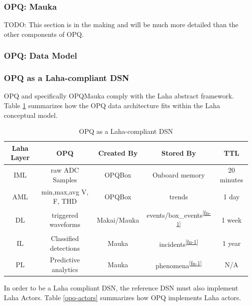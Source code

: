 \subsubsection{OPQ: Mauka}

TODO: This section is in the making and will be much more detailed than the other components of OPQ.

\subsubsection{OPQ: Data Model}

\subsubsection{OPQ as a Laha-compliant DSN}
OPQ and specifically OPQMauka comply with the Laha abstract framework. Table \ref{opq-compliance} summarizes how the OPQ data architecture fits within the Laha conceptual model.

\begin{table}
	\caption{OPQ as a Laha-compliant DSN}
	\begin{tabular}{|c|c|c|c|c|}
		\hline 
		Laha Layer & OPQ & Created By & Stored By & TTL \\ 
		\hline 
		IML & raw ADC Samples & OPQBox & Onboard memory & 20 minutes \\ 
		\hline 
		AML & min,max,avg V, F, THD & OPQBox & trends\footnotemark & 1 day \\ 
		\hline 	
		DL & triggered waveforms & Makai/Mauka & events/box\_events\textsuperscript{\ref{fn-1}} & 1 week \\
		\hline
		IL & Classified detections & Mauka & incidents\textsuperscript{\ref{fn-1}} & 1 year \\
		\hline
		PL & Predictive analytics & Mauka & phenomena\textsuperscript{\ref{fn-1}} & N/A \\
		\hline
	\end{tabular}
\label{opq-compliance}
\end{table}  

In order to be a Laha compliant DSN, the reference DSN must also implement Laha Actors. Table \ref{opq-actors} summarizes how OPQ implements Laha actors.

